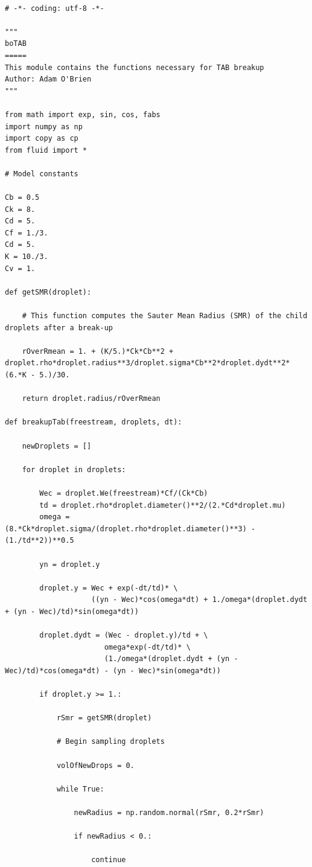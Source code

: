 \documentclass[12pt]{article}
\begin{document}
\begin{lstlisting}

# -*- coding: utf-8 -*-

"""
boTAB
=====
This module contains the functions necessary for TAB breakup
Author: Adam O'Brien
"""

from math import exp, sin, cos, fabs
import numpy as np
import copy as cp
from fluid import *

# Model constants

Cb = 0.5
Ck = 8.
Cd = 5.
Cf = 1./3.
Cd = 5.
K = 10./3.
Cv = 1.

def getSMR(droplet):

    # This function computes the Sauter Mean Radius (SMR) of the child droplets after a break-up

    rOverRmean = 1. + (K/5.)*Ck*Cb**2 + droplet.rho*droplet.radius**3/droplet.sigma*Cb**2*droplet.dydt**2*(6.*K - 5.)/30.

    return droplet.radius/rOverRmean

def breakupTab(freestream, droplets, dt):

    newDroplets = []

    for droplet in droplets:

        Wec = droplet.We(freestream)*Cf/(Ck*Cb)
        td = droplet.rho*droplet.diameter()**2/(2.*Cd*droplet.mu)
        omega = (8.*Ck*droplet.sigma/(droplet.rho*droplet.diameter()**3) - (1./td**2))**0.5

        yn = droplet.y

        droplet.y = Wec + exp(-dt/td)* \
                    ((yn - Wec)*cos(omega*dt) + 1./omega*(droplet.dydt + (yn - Wec)/td)*sin(omega*dt))

        droplet.dydt = (Wec - droplet.y)/td + \
                       omega*exp(-dt/td)* \
                       (1./omega*(droplet.dydt + (yn - Wec)/td)*cos(omega*dt) - (yn - Wec)*sin(omega*dt))

        if droplet.y >= 1.:

            rSmr = getSMR(droplet)

            # Begin sampling droplets

            volOfNewDrops = 0.

            while True:
                
                newRadius = np.random.normal(rSmr, 0.2*rSmr)
                
                if newRadius < 0.:
                    
                    continue
                

\end{lstlisting}
\end{document}
